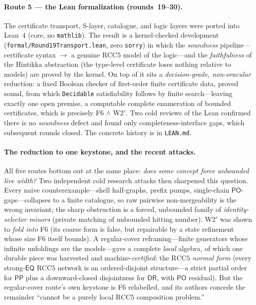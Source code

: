 \documentclass[
]{ceurart}
\theoremstyle{definition}
\newcommand{\DR}{\ensuremath{\mathsf{DR}}}
\newcommand{\PO}{\ensuremath{\mathsf{PO}}}
\newcommand{\EQ}{\ensuremath{\mathsf{EQ}}}
\newcommand{\PP}{\ensuremath{\mathsf{PP}}}
\begin{document}
\paragraph{Route 5 --- the Lean formalization (rounds~19--30).}
The certificate transport, S-layer, catalogue, and logic layers were
ported into Lean~4 (core, no \texttt{mathlib}).  The result is a
kernel-checked development (\texttt{formal/Round19Transport.lean}, zero
\texttt{sorry}) in which the \emph{soundness} pipeline---certificate
syntax $\to$ a genuine $\mathrm{RCC5}$ model of the logic---and the
\emph{faithfulness} of the Hintikka abstraction (the type-level
certificate loses nothing relative to models) are proved by the kernel.
On top of it sits a \emph{decision-grade, non-oracular} reduction: a
fixed Boolean checker of first-order finite certificate data, proved
sound, from which \texttt{Decidable} satisfiability follows by finite
search---leaving exactly one open premise, a computable complete
enumeration of bounded certificates, which is precisely F6 $\wedge$
W2$'$.  Two cold reviews of the Lean confirmed there is no
\emph{soundness} defect and found only completeness-interface gaps, which
subsequent rounds closed.  The concrete history is in \texttt{LEAN.md}.

\paragraph{The reduction to one keystone, and the recent attacks.}
All five routes bottom out at the same place: \emph{does some concept
force unbounded live width?}  Two independent cold research attacks then
sharpened this question.  Every naive counterexample---shell half-graphs,
prefix pumps, single-chain \PO-gaps---collapses to a finite catalogue, so
raw pairwise non-mergeability is the wrong invariant; the sharp
obstruction is a forced, unbounded family of \emph{identity-selector
minors} (private matching of unbounded hitting number).  W2$'$ was shown
to \emph{fold into} F6 (its coarse form is false, but repairable by a
state refinement whose size F6 itself bounds).  A regular-cover
reframing---finite generators whose infinite unfoldings are the
models---gave a complete \emph{local} algebra, of which one durable
piece was harvested and machine-\emph{certified}: the $\mathrm{RCC5}$
\emph{normal form} (every strong-$\EQ$ $\mathrm{RCC5}$ network is an
ordered-disjoint structure---a strict partial order for $\PP$ plus a
downward-closed disjointness for $\DR$, with $\PO$ residual).  But the
regular-cover route's own keystone is F6 relabelled, and its authors
concede the remainder ``cannot be a purely local $\mathrm{RCC5}$
composition problem.''
\end{document}
